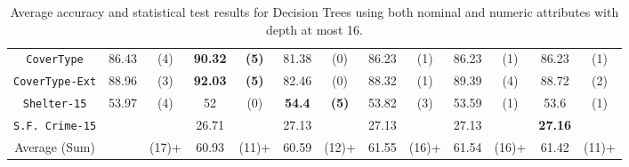 \begin{table}
\begin{tabular}{c|cc|cc|cc|cc|cc|cc}
{\tt CoverType}      &  86.43         &  (4)              &  {\bf 90.32}&  {\bf (5)}    &  81.38       &  (0)               &  86.23      & (1)            & 86.23        & (1)       & 86.23        & (1)       \\
{\tt CoverType-Ext}  &  88.96         &  (3)              &  {\bf 92.03}&  {\bf (5)}    &  82.46       &  (0)               &  88.32      & (1)            & 89.39        & (4)       & 88.72        & (2)       \\
{\tt Shelter-15}     &  53.97         &  (4)              &  52         &  (0)          &  {\bf 54.4}  &  {\bf (5)}         &  53.82      & (3)            & 53.59        & (1)       & 53.6         & (1)       \\   
{\tt S.F. Crime-15}  &                &                   &  26.71      &               &  27.13       &                    &  27.13      &                & 27.13        &           & {\bf 27.16}  &           \\
\hline
Average (Sum)        &                &  (17)+            & 60.93       &  (11)+        &   60.59      &  (12)+             &  61.55      & (16)+          & 61.54        & (16)+     & 61.42        & (11)+

\end{tabular}
\caption{Average accuracy and statistical test results for  Decision Trees using both nominal and numeric attributes with depth at most 16.}
\label{exp:numeric-16}
\end{table}

